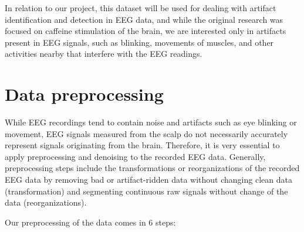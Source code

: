 \documentclass[12pt,a4paper,titlepage,openany]{report}
\begin{document}
In relation to our project, this dataset will be used for dealing with artifact identification and detection in EEG data, and while the original research was focused on caffeine stimulation of the brain, we are interested only in artifacts present in EEG signals, such as blinking, movements of muscles, and other activities nearby that interfere with the EEG readings.


\section{Data preprocessing}

While EEG recordings tend to contain noise and artifacts such as eye blinking or movement, EEG signals measured from the scalp do not necessarily accurately represent signals originating from the brain. 
Therefore, it is very essential to apply preprocessing and denoising to the recorded EEG data. 
Generally, preprocessing steps include the transformations or reorganizations of the recorded EEG data by removing bad or artifact-ridden data without changing clean data (transformation) and segmenting continuous raw signals without change of the data (reorganizations).

Our preprocessing of the data comes in 6 steps:
\end{document}
